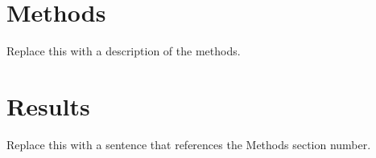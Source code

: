 \documentclass{article}
\begin{document}
\section{Methods}

Replace this with a description of the methods.

\section{Results}

Replace this with a sentence that references the Methods section number.
\end{document}

